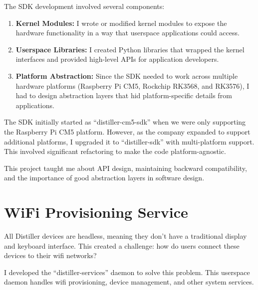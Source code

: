 \documentclass[12pt,a4paper]{report}
\begin{document}
\vspace{0.3cm}

The SDK development involved several components:

\begin{enumerate}[itemsep=0.3cm]
    \item \textbf{Kernel Modules:} I wrote or modified kernel modules to expose the hardware functionality in a way that userspace applications could access.

    \item \textbf{Userspace Libraries:} I created Python libraries that wrapped the kernel interfaces and provided high-level APIs for application developers.

    \item \textbf{Platform Abstraction:} Since the SDK needed to work across multiple hardware platforms (Raspberry Pi CM5, Rockchip RK3568, and RK3576), I had to design abstraction layers that hid platform-specific details from applications.
\end{enumerate}

\vspace{0.3cm}

The SDK initially started as ``distiller-cm5-sdk'' when we were only supporting the Raspberry Pi CM5 platform. However, as the company expanded to support additional platforms, I upgraded it to ``distiller-sdk'' with multi-platform support. This involved significant refactoring to make the code platform-agnostic.

\vspace{0.3cm}

This project taught me about API design, maintaining backward compatibility, and the importance of good abstraction layers in software design.

\section{WiFi Provisioning Service}

All Distiller devices are headless, meaning they don't have a traditional display and keyboard interface. This created a challenge: how do users connect these devices to their wifi networks?

\vspace{0.3cm}

I developed the ``distiller-services'' daemon to solve this problem. This userspace daemon handles wifi provisioning, device management, and other system services.
\end{document}
